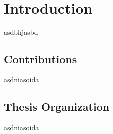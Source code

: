 
\chapter{Introduction}
\label{ch:Introduction}

asdbhjasbd

\section{Contributions  }
asdniasoida

\section{Thesis Organization }
asdniasoida

\endinput

